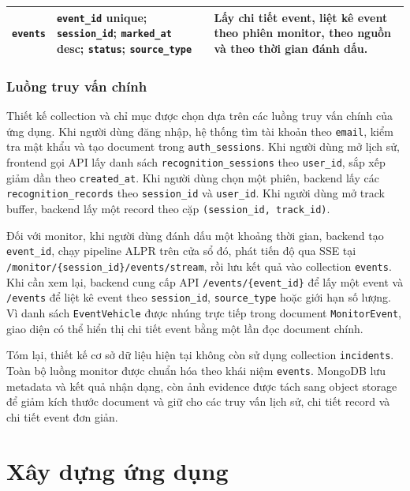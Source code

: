 \documentclass[../DoAn.tex]{subfiles}
\begin{document}
\begin{table}[H]
\begin{tabular}{|>{\raggedright\arraybackslash}p{3.4cm}|>{\raggedright\arraybackslash}p{5.6cm}|>{\raggedright\arraybackslash}p{5.4cm}|}
\hline
\texttt{events} & \texttt{event\_id} unique; \newline \texttt{session\_id}; \newline \texttt{marked\_at} desc; \newline \texttt{status}; \newline \texttt{source\_type} & Lấy chi tiết event, liệt kê event theo phiên monitor, theo nguồn và theo thời gian đánh dấu. \\
\hline
\end{tabular}
\end{table}

\subsubsection{Luồng truy vấn chính}

Thiết kế collection và chỉ mục được chọn dựa trên các luồng truy vấn chính của ứng dụng. Khi người dùng đăng nhập, hệ thống tìm tài khoản theo \texttt{email}, kiểm tra mật khẩu và tạo document trong \texttt{auth\_sessions}. Khi người dùng mở lịch sử, frontend gọi API lấy danh sách \texttt{recognition\_sessions} theo \texttt{user\_id}, sắp xếp giảm dần theo \texttt{created\_at}. Khi người dùng chọn một phiên, backend lấy các \texttt{recognition\_records} theo \texttt{session\_id} và \texttt{user\_id}. Khi người dùng mở track buffer, backend lấy một record theo cặp \texttt{(session\_id, track\_id)}.

Đối với monitor, khi người dùng đánh dấu một khoảng thời gian, backend tạo \texttt{event\_id}, chạy pipeline ALPR trên cửa sổ đó, phát tiến độ qua SSE tại \texttt{/monitor/\{session\_id\}/events/stream}, rồi lưu kết quả vào collection \texttt{events}. Khi cần xem lại, backend cung cấp API \texttt{/events/\{event\_id\}} để lấy một event và \texttt{/events} để liệt kê event theo \texttt{session\_id}, \texttt{source\_type} hoặc giới hạn số lượng. Vì danh sách \texttt{EventVehicle} được nhúng trực tiếp trong document \texttt{MonitorEvent}, giao diện có thể hiển thị chi tiết event bằng một lần đọc document chính.

Tóm lại, thiết kế cơ sở dữ liệu hiện tại không còn sử dụng collection \texttt{incidents}. Toàn bộ luồng monitor được chuẩn hóa theo khái niệm \texttt{events}. MongoDB lưu metadata và kết quả nhận dạng, còn ảnh evidence được tách sang object storage để giảm kích thước document và giữ cho các truy vấn lịch sử, chi tiết record và chi tiết event đơn giản.


\section{Xây dựng ứng dụng}
\end{document}
